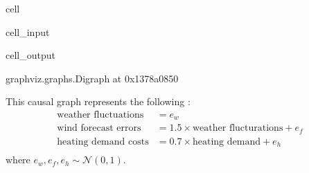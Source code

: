 \documentclass[letterpaper,10pt,english]{jupyterBook}
\begin{document}
\begin{sphinxuseclass}{cell}\begin{sphinxVerbatimInput}

\begin{sphinxuseclass}{cell_input}
\begin{sphinxVerbatim}[commandchars=\\\{\}]
  \PYG{p}{[}\PYG{p}{[}  \PYG{p}{]}
              \PYG{p}{[}  \PYG{p}{]}
              \PYG{p}{[}  \PYG{p}{]}\PYG{p}{]}

 \PYG{p}{[}  \PYG{p}{]}
\end{sphinxVerbatim}

\end{sphinxuseclass}\end{sphinxVerbatimInput}
\begin{sphinxVerbatimOutput}

\begin{sphinxuseclass}{cell_output}
\begin{sphinxVerbatim}[commandchars=\\\{\}]
\PYGZlt{}graphviz.graphs.Digraph at 0x1378a0850\PYGZgt{}
\end{sphinxVerbatim}

\end{sphinxuseclass}\end{sphinxVerbatimOutput}

\end{sphinxuseclass}
\sphinxAtStartPar
This causal graph represents the following :
\label{equation:notebooks/basic_dag_structures:edbce26f-3a4e-4c4c-8914-fe943416049c}\begin{align}
\text{weather fluctuations} &= e_w \\
\text{wind forecast errors} &= 1.5 \times \text{weather flucturations} + e_f \\
\text{heating demand costs} &= 0.7 \times \text{heating demand} + e_h \\
\end{align}
\sphinxAtStartPar
where \(e_w, e_f, e_h \sim \mathcal{N}(0,1)\).
\end{document}
